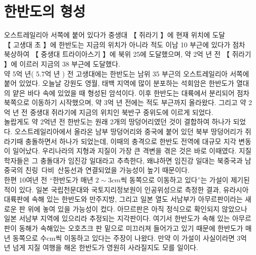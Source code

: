 \documentclass[12pt,a4paper]{book}
\newcommand{\SectionMargin}			{\newpage  \null \vskip 0cm}
\newcommand{\red}		{\color{red}}			%
\newcommand{\black}	{\color{black}}		%
\begin{document}
	
	
	

	\SectionMargin
	\section{한반도의 형성}
	\null



			\Large 
			오스트레일리아 서쪽에 붙어 있다가 중생대 【 쥐라기 】에 현재 위치에 도달
			\normalsize \\
			
			\red
			【 고생대 초 】에 한반도는 지금의 위치가 아니라 적도 이남 10 부근에 있다가 
			점차 북상하여 【 중생대 트라이아스기 】에 북위 25에 도달했으며, 
			약 2억 년 전 【 쥐라기 】에 이르러 지금의 38 부근에 도달했다.
			\black \\
			


약 5억 년( 5.7억 년 ) 전 고생대에는 한반도는 남위 35 부근의 오스트레일리아 서쪽에 붙어 있었다. 
오늘날 강원도 영월, 태백 지역에 많이 분포하는 석회암은 한반도가 열대의 얕은 바다 속에 있었을 때 형성된 암석이다. 
이후 한반도는 대륙에서 분리되어 점차 북쪽으로 이동하기 시작했으며, 약 3억 년 전에는 적도 부근까지 올라왔다. 
그리고 약 2억 년 전 중생대 쥐라기에 지금의 위치인 북반구 중위도에 이르게 되었다.
\\[-1.0em]

놀랍게도 약 2억년 전 한반도는 원래 2개의 땅덩어리였던 것이 결합하여 하나가 되었다. 
오스트레일리아에서 올라온 남부 땅덩어리와 중국에 붙어 있던 북부 땅덩어리가 쥐라기때 충돌하면서 하나가 되었는데, 
이때의 충격으로 한반도 전역에 대규모 지각 변동이 일어났다. 
우리나라의 지형과 지질이 가장 큰 격변을 겪은 것은 바로 이때였다. 
지질학자들은 그 충돌대가 임진강 일대라고 추측한다, 
왜냐하면 임진강 일대는 북중국과 남중국의 친링~다비~산둥선과 연결되었을 가능성이 높기 때문이다.
\\[-1.0em]

한편 10여년 전 ``한반도가 매년 $2 \sim 3 cm$씩 동쪽으로 이동하고 있다''는 가설이 제기된 적이 있다. 
일본 국립천문대와 국토지리정보원이 인공위성으로 측정한 결과, 
유라시아 대륙판에 속해 있는 한반도와 만주지방, 그리고 일본 열도 서남부가 아무르판이라는 새로운 판 위에 놓여 있을 가능성이 컸다. 
아므르판은 아직 정식으로 확인되지 않았으나 일본 서남부 지역에 있으리라 추정되는 지각판이다. 
여기서 한반도가 속해 있는 아무르판이 동해가 속해있는 오호츠크 판 밑으로 미끄러져 들어가고 있기 때문에 
한반도가 매년 동쪽으로 수cm씩 이동하고 있다는 주장이 나왔다.
만약 이 가설이 사실이라면 3억년 넘게 지질 여행을 해온 한반도가 영원히 사라질지도 모를 일이다.
\\[-1.0em]
\end{document}
